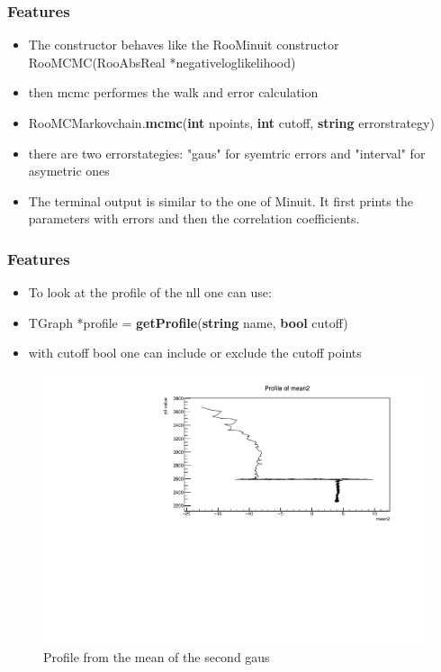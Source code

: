 \documentclass{beamer}
\begin{document}



\begin{frame}
 \frametitle{Features}
 \begin{itemize}
  \item The constructor behaves like the RooMinuit constructor RooMCMC(RooAbsReal *negativeloglikelihood)
  \item then mcmc performes the walk and error calculation
  \item RooMCMarkovchain.\textbf{mcmc}(\textbf{int} npoints, \textbf{int} cutoff, \textbf{string} errorstrategy)
  \item there are two errorstategies: "gaus" for syemtric errors and "interval" for asymetric ones
  \item The terminal output is similar to the one of Minuit. It first prints the parameters with errors and then the correlation coefficients.
 \end{itemize}
\end{frame}

\begin{frame}
 \frametitle{Features}
 \begin{itemize}
  \item To look at the profile of the nll one can use:
  \item TGraph *profile = \textbf{getProfile}(\textbf{string} name, \textbf{bool} cutoff)
  \item with cutoff bool one can include or exclude the cutoff points
 \end{itemize}

 \begin{figure}
  \includegraphics[width=0.8\linewidth]{figures/profile_mean2}
  \caption{Profile from the mean of the second gaus}
 \end{figure}

\end{frame}
\end{document}
